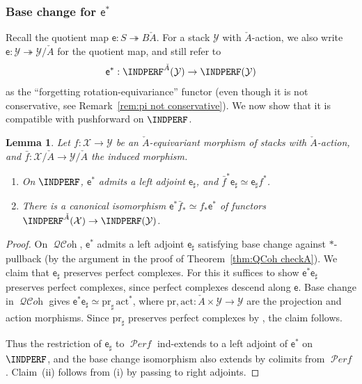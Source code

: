 \documentclass[12pt, oneside]{amsart}
\numberwithin{equation}{section}
\newtheorem{lemma}[subsubsection]{Lemma}
\theoremstyle{remark}
\theoremstyle{plain}
\DeclareMathOperator{\QCOH}{\mathcal{QC}\textit{oh}}
\DeclareMathOperator{\PERF}{\mathcal{P}\textit{erf}}
\newcommand{\YY}{\mathcal{Y}}
\newcommand{\XX}{\mathcal{X}}
\newcommand{\sfe}{\mathsf{e}}
\begin{document}
\subsubsection{Base change for $\sfe^*$}\label{sssec:forget rotation equivariance}

Recall the quotient map $\sfe : S \twoheadrightarrow B\check{A}$.
For a stack $\YY$ with $\check{A}$-action, we also write $\sfe : \YY \twoheadrightarrow \YY/\check{A}$ for the quotient map, and still refer to
\[
  \sfe^* : \INDPERF^{\check{A}}(\YY) \to \INDPERF(\YY)
\]
as the ``forgetting rotation-equivariance'' functor (even though it is not conservative, see Remark~\ref{rem:pi not conservative}).
We now show that it is compatible with pushforward on $\INDPERF$.

\begin{lemma}\label{lem:sfe base change}
  Let $f : \XX \to \YY$ be an $\check{A}$-equivariant morphism of stacks with $\check{A}$-action, and $\bar{f} : \XX/\check{A} \to \YY/\check{A}$ the induced morphism.
  \begin{enumerate}
    \item On $\INDPERF$, $\sfe^*$ admits a left adjoint $\sfe_\sharp$, and $\bar{f}^*\sfe_\sharp \simeq \sfe_\sharp f^*$.
    \item There is a canonical isomorphism $\sfe^*\bar{f}_* \simeq f_*\sfe^*$ of functors $\INDPERF^{\check{A}}(\XX) \to \INDPERF(\YY)$.
  \end{enumerate}
\end{lemma}

\begin{proof}
  On $\QCOH$, $\sfe^*$ admits a left adjoint $\sfe_\sharp$ satisfying base change against $*$-pullback (by the argument in the proof of Theorem~\ref{thm:QCoh checkA}).
  We claim that $\sfe_\sharp$ preserves perfect complexes.
  For this it suffices to show $\sfe^*\sfe_\sharp$ preserves perfect complexes, since perfect complexes descend along $\sfe$.
  Base change in $\QCOH$ gives $\sfe^*\sfe_\sharp \simeq \mathrm{pr}_\sharp\,\mathrm{act}^*$, where $\mathrm{pr}, \mathrm{act} : \check{A} \times \YY \to \YY$ are the projection and action morphisms.
  Since $\mathrm{pr}_\sharp$ preserves perfect complexes by \cite[Rem.~A.4]{weilres}, the claim follows.

  Thus the restriction of $\sfe_\sharp$ to $\PERF$ ind-extends to a left adjoint of $\sfe^*$ on $\INDPERF$, and the base change isomorphism also extends by colimits from $\PERF$.
  Claim~(ii) follows from (i) by passing to right adjoints.
\end{proof}
\end{document}
